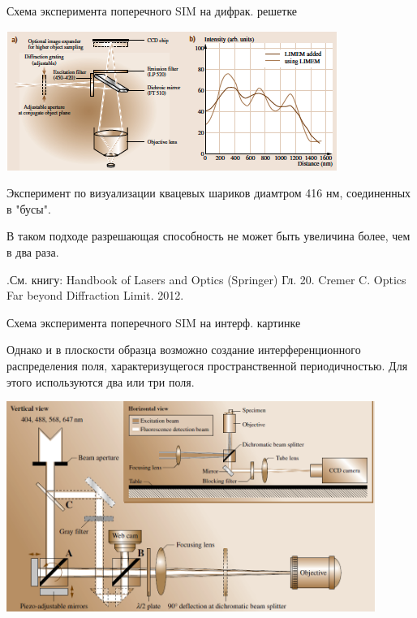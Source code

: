 \documentclass[9pt, compress, xcolor=table]{beamer}
\begin{document}
\begin{frame}{Схема эксперимента поперечного SIM на дифрак. решетке}
\begin{center}
\includegraphics[width=\textwidth]{ffm05}
\end{center}

{\small Эксперимент по визуализации квацевых шариков диамтром 416 нм, соединенных в "бусы". 

В таком подходе разрешающая способность не может быть увеличина более, чем в два раза.

.См. книгу: Handbook of Lasers and Optics (Springer) Гл. 20. Cremer C. Optics Far beyond Diffraction Limit. 2012.}
\end{frame}

\begin{frame}{Схема эксперимента поперечного SIM на интерф. картинке}

Однако и в плоскости образца возможно создание интерференционного распределения поля, характеризущегося пространственной периодичностью. Для этого используются два или три поля.

\begin{center}
\includegraphics[width=0.9\textwidth]{sim23}
\end{center}
\end{frame}
\end{document}
